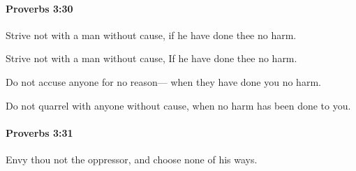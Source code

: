 		\paragraph{Proverbs 3:30} %
			\label{PROVERBS-3-30}

			Strive not with a man without cause, if he have done thee no harm.

			\begin{versebox}
					\item[BHS] 
					\item[ASV] Strive not with a man without cause, If he have done thee no harm.
					\item[NIV] Do not accuse anyone for no reason— when they have done you no harm.
					\item[NRSV] Do not quarrel with anyone without cause, when no harm has been done to you.
			\end{versebox}

		\paragraph{Proverbs 3:31} %
			\label{PROVERBS-3-31}

			Envy thou not the oppressor, and choose none of his ways.

